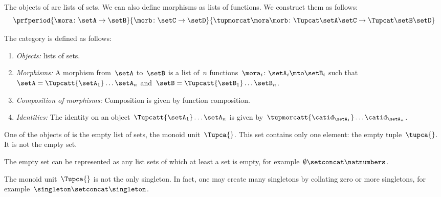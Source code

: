 The objects of \SetL are lists of sets.
We can also define morphisms as lists of functions.
We construct them as follows:
%
\begin{equation}
    \label{eq:sets-monoid-maps2}
    \prfperiod{
        \mora \colon \setA \to \setB
    }{
        \morb \colon \setC \to \setD
    }{
        \tupmorcat \mora \morb \colon \Tupcat \setA   \setC \to \Tupcat \setB  \setD
    }
\end{equation}
%
\begin{definition}
    \label{def:SetL}
    The category \SetL is defined as follows:
    \begin{enumerate}
        \item \emph{Objects:} lists of sets.
        \item \emph{Morphisms:} A morphism from~$\setA$ to~$\setB$ is a list of~$n$ functions~$\mora_i\colon \setA_i \mto \setB_i$ such that~$\setA = \Tupcatt {\setA_1}  \dots {\setA_n}$ and~$\setB = \Tupcatt {\setB_1} \dots {\setB_n}$.
        \item \emph{Composition of morphisms:} Composition is given by function composition.
        \item \emph{Identities:} The identity on an object~$\Tupcatt {\setA_1} \dots {\setA_n}$ is given by~$\tupmorcatt {\catid_{\setA_1}} \dots  {\catid_{\setA_n}} $.
    \end{enumerate}
\end{definition}


One of the objects of \SetL is the empty list of sets, the monoid unit~$\Tupca{ }$.
This set contains only one element: the empty tuple~$\tupca{ }.$
It is not the empty set.

The empty set can be represented as any list sets of which at least a set is empty, for example~$\emptyset \setconcat \natnumbers$.

The monoid unit~$\Tupca{ }$ is not the only singleton.
In fact, one may create many singletons by collating zero or more singletons, for example~$\singleton \setconcat \singleton$.

%

\showslides{
    \begin{forslides}

        \begin{equation}
            \tupca \ela   = \ela
        \end{equation}
        ~
        \begin{equation}
            \label{eq:sets-monoid-el-cat}
            \tupcat \ela \elb \elconcat \elc = \tupcatt \ela \elb \elc
        \end{equation}
    \end{forslides}
}
